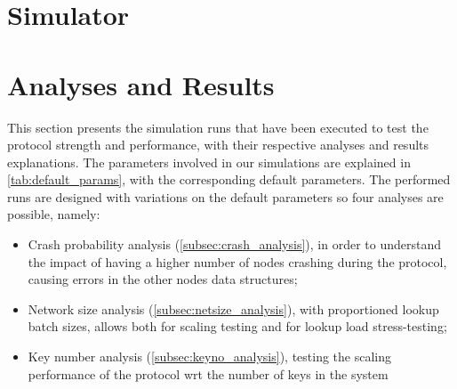 \documentclass[11pt,twocolumn,letterpaper]{article}
\begin{document}
	\section{Simulator}
	\label{sec:simulator}
	
	\section{Analyses and Results}
	\label{sec:analyses}

	This section presents the simulation runs that have been executed to test the protocol strength and performance, with their respective analyses and results explanations. The parameters involved in our simulations are explained in \cref{tab:default_params}, with the corresponding default parameters. The performed runs are designed with variations on the default parameters so four analyses are possible, namely:
	\begin{itemize}
		\item Crash probability analysis (\cref{subsec:crash_analysis}), in order to understand the impact of having a higher number of nodes crashing during the protocol, causing errors in the other nodes data structures;
		\item Network size analysis (\cref{subsec:netsize_analysis}), with proportioned lookup batch sizes, allows both for scaling testing and for lookup load stress-testing;
		\item Key number analysis (\cref{subsec:keyno_analysis}), testing the scaling performance of the protocol wrt the number of keys in the system
	\end{itemize}
	
\end{document}
